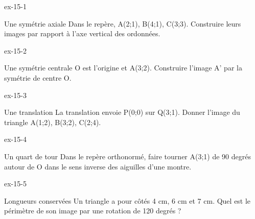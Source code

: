 \clearpage{}
\begin{blocLivre}{ex-15-1}\begin{exercice}[1]{Une symétrie axiale}
Dans le repère, A(2;1), B(4;1), C(3;3). Construire leurs images par rapport à l’axe vertical des ordonnées.
\label{fig-ex-15-1}
\end{exercice}\end{blocLivre}
\begin{blocLivre}{ex-15-2}\begin{exercice}[1]{Une symétrie centrale}
O est l’origine et A(3;2). Construire l’image A’ par la symétrie de centre O.
\label{fig-ex-15-2}
\end{exercice}\end{blocLivre}
\begin{blocLivre}{ex-15-3}\begin{exercice}[1]{Une translation}
La translation envoie P(0;0) sur Q(3;1). Donner l’image du triangle A(1;2), B(3;2), C(2;4).
\label{fig-ex-15-3}
\end{exercice}\end{blocLivre}
\begin{blocLivre}{ex-15-4}\begin{exercice}[1]{Un quart de tour}
Dans le repère orthonormé, faire tourner A(3;1) de 90 degrés autour de O dans le sens inverse des aiguilles d’une montre.
\label{fig-ex-15-4}
\end{exercice}\end{blocLivre}
\begin{blocLivre}{ex-15-5}\begin{exercice}[1]{Longueurs conservées}
Un triangle a pour côtés 4 cm, 6 cm et 7 cm. Quel est le périmètre de son image par une rotation de 120 degrés ?
\label{fig-ex-15-5}
\end{exercice}\end{blocLivre}

